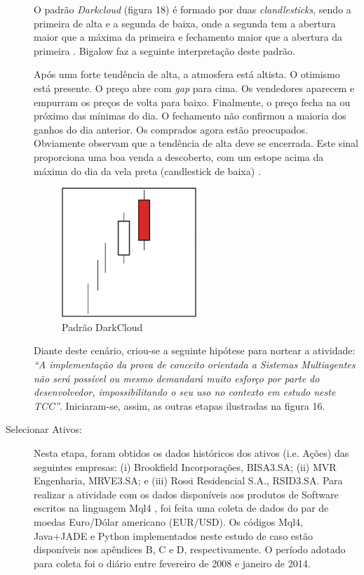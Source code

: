 \begin{description}
O padrão \textit{Darkcloud} (figura 18) é formado por duas \textit{clandlesticks}, sendo a primeira de alta e a segunda de baixa, onde a segunda tem a abertura maior que a máxima da primeira e fechamento maior que a abertura da primeira \cite[p.61]{matsura2006}. Bigalow faz a seguinte interpretação deste padrão.

\begin{citacao}
Após uma forte tendência de alta, a atmosfera está altista. O otimismo está presente. O preço abre com \textit{gap} para cima. Os vendedores aparecem e empurram os preços de volta para baixo. Finalmente, o preço fecha na ou próximo das mínimas do dia. O fechamento não confirmou a maioria dos ganhos do dia anterior. Os comprados agora estão preocupados. Obviamente observam que a tendência de alta deve se encerrada. Este sinal proporciona uma boa venda a descoberto, com um estope acima da máxima do dia da vela preta (candlestick de baixa) . \newline \cite[p.47]{bigalow2010}

\end{citacao}
\begin{figure}[h!]
\centering
\label{f14}
\includegraphics[width=0.5\textwidth]{figuras/f11}
\caption{Padrão DarkCloud}
\FloatBarrier
\end{figure}

Diante deste cenário, criou-se a seguinte hipótese para nortear a atividade: \textit{“A implementação da prova de conceito orientada a Sistemas Multiagentes não será possível ou mesmo demandará muito esforço por parte do desenvolvedor, impossibilitando o seu uso no contexto em estudo neste TCC”}. Iniciaram-se, assim, as outras etapas ilustradas na figura 16.

\item [Selecionar Ativos:]
Nesta etapa, foram obtidos os dados históricos dos ativos (i.e. Ações) das seguintes empresas: (i) Brookfield Incorporações, BISA3.SA; (ii) MVR Engenharia, MRVE3.SA; e (iii) Rossi Residencial S.A., RSID3.SA. Para realizar a atividade com os dados disponíveis aos produtos de Software escritos na linguagem Mql4 \cite{kovalyov2006}, foi feita uma coleta de dados do par de moedas Euro/Dólar americano (EUR/USD). Os códigos Mql4, Java+JADE e Python implementados neste estudo de caso estão disponíveis nos apêndices B, C e D, respectivamente. O período adotado para coleta foi o diário entre fevereiro de 2008 e janeiro de 2014.


\end{description}
